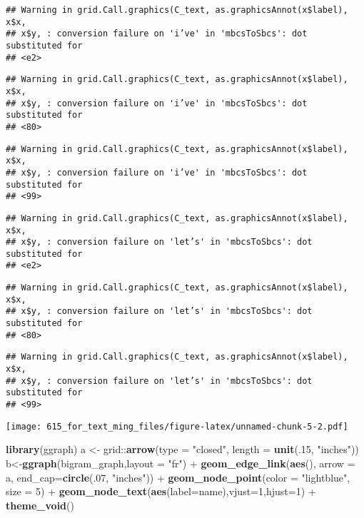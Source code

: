 \documentclass[]{article}
\newenvironment{Shaded}{\begin{snugshade}}{\end{snugshade}}
\newcommand{\KeywordTok}[1]{\textcolor[rgb]{0.13,0.29,0.53}{\textbf{{#1}}}}
\newcommand{\DataTypeTok}[1]{\textcolor[rgb]{0.13,0.29,0.53}{{#1}}}
\newcommand{\DecValTok}[1]{\textcolor[rgb]{0.00,0.00,0.81}{{#1}}}
\newcommand{\StringTok}[1]{\textcolor[rgb]{0.31,0.60,0.02}{{#1}}}
\newcommand{\NormalTok}[1]{{#1}}
\begin{document}
\begin{verbatim}
## Warning in grid.Call.graphics(C_text, as.graphicsAnnot(x$label), x$x,
## x$y, : conversion failure on 'i’ve' in 'mbcsToSbcs': dot substituted for
## <e2>
\end{verbatim}

\begin{verbatim}
## Warning in grid.Call.graphics(C_text, as.graphicsAnnot(x$label), x$x,
## x$y, : conversion failure on 'i’ve' in 'mbcsToSbcs': dot substituted for
## <80>
\end{verbatim}

\begin{verbatim}
## Warning in grid.Call.graphics(C_text, as.graphicsAnnot(x$label), x$x,
## x$y, : conversion failure on 'i’ve' in 'mbcsToSbcs': dot substituted for
## <99>
\end{verbatim}

\begin{verbatim}
## Warning in grid.Call.graphics(C_text, as.graphicsAnnot(x$label), x$x,
## x$y, : conversion failure on 'let’s' in 'mbcsToSbcs': dot substituted for
## <e2>
\end{verbatim}

\begin{verbatim}
## Warning in grid.Call.graphics(C_text, as.graphicsAnnot(x$label), x$x,
## x$y, : conversion failure on 'let’s' in 'mbcsToSbcs': dot substituted for
## <80>
\end{verbatim}

\begin{verbatim}
## Warning in grid.Call.graphics(C_text, as.graphicsAnnot(x$label), x$x,
## x$y, : conversion failure on 'let’s' in 'mbcsToSbcs': dot substituted for
## <99>
\end{verbatim}

\texttt{[image: 615\_for\_text\_ming\_files/figure-latex/unnamed-chunk-5-2.pdf]}

\begin{Shaded}
\begin{Highlighting}[]
\KeywordTok{library}\NormalTok{(ggraph)}
\NormalTok{a <-}\StringTok{ }\NormalTok{grid::}\KeywordTok{arrow}\NormalTok{(}\DataTypeTok{type =} \StringTok{"closed"}\NormalTok{, }\DataTypeTok{length =} \KeywordTok{unit}\NormalTok{(.}\DecValTok{15}\NormalTok{, }\StringTok{"inches"}\NormalTok{))}
\NormalTok{b<-}\KeywordTok{ggraph}\NormalTok{(bigram_graph,}\DataTypeTok{layout =} \StringTok{"fr"}\NormalTok{) +}\StringTok{ }
\StringTok{  }\KeywordTok{geom_edge_link}\NormalTok{(}\KeywordTok{aes}\NormalTok{(), }\DataTypeTok{arrow =} \NormalTok{a, }\DataTypeTok{end_cap=}\KeywordTok{circle}\NormalTok{(.}\DecValTok{07}\NormalTok{, }\StringTok{"inches"}\NormalTok{)) +}\StringTok{ }
\StringTok{  }\KeywordTok{geom_node_point}\NormalTok{(}\DataTypeTok{color =} \StringTok{"lightblue"}\NormalTok{, }\DataTypeTok{size =} \DecValTok{5}\NormalTok{) +}\StringTok{ }
\StringTok{  }\KeywordTok{geom_node_text}\NormalTok{(}\KeywordTok{aes}\NormalTok{(}\DataTypeTok{label=}\NormalTok{name),}\DataTypeTok{vjust=}\DecValTok{1}\NormalTok{,}\DataTypeTok{hjust=}\DecValTok{1}\NormalTok{) +}
\StringTok{  }\KeywordTok{theme_void}\NormalTok{()}
\end{Highlighting}
\end{Shaded}
\end{document}
